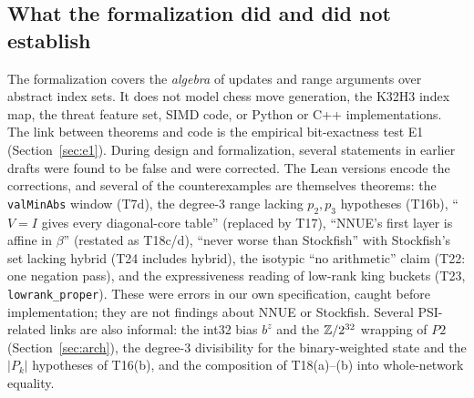 \subsection{What the formalization did and did not establish}\label{sec:formal-scope}

The formalization covers the \emph{algebra} of updates and range arguments over abstract index sets.
It does not model chess move generation, the K32H3 index map, the threat feature set, SIMD code, or Python or C++ implementations.
The link between theorems and code is the empirical bit-exactness test E1 (Section~\ref{sec:e1}).
During design and formalization, several statements in earlier drafts were found to be false and were corrected. The Lean versions encode the corrections, and several of the counterexamples are themselves theorems:
the \texttt{valMinAbs} window (T7d),
the degree-3 range lacking $p_2,p_3$ hypotheses (T16b),
``$V=I$ gives every diagonal-core table'' (replaced by T17),
``NNUE's first layer is affine in $\beta$'' (restated as T18c/d),
``never worse than Stockfish'' with Stockfish's set lacking hybrid (T24 includes hybrid),
the isotypic ``no arithmetic'' claim (T22: one negation pass),
and the expressiveness reading of low-rank king buckets (T23, \texttt{lowrank\_proper}).
These were errors in our own specification, caught before implementation; they are not findings about NNUE or Stockfish.
Several PSI-related links are also informal: the int32 bias $b^z$ and the $\mathbb{Z}/2^{32}$ wrapping of $P2$ (Section~\ref{sec:arch}), the degree-3 divisibility for the binary-weighted state and the $|P_k|$ hypotheses of T16(b), and the composition of T18(a)--(b) into whole-network equality.


